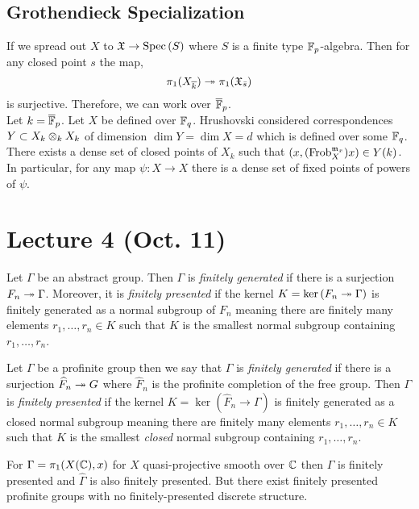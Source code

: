 \documentclass[12pt]{article}
\begin{document}
\subsection{Grothendieck Specialization}

If we spread out $X$ to $\mathfrak{X} \to \mathrm{Spec}\left( S \right)$ where $S$ is a finite type $\mathbb{F}_p$-algebra. Then for any closed point $s$ the map,
\[ \pi_1(X_{\overline{k}}) \twoheadrightarrow \pi_1(\mathfrak{X}_{\bar{s}}) \]
is surjective. Therefore, we can work over $\overline{\mathbb{F}}_p$.
\bigskip\\
Let $k = \overline{\mathbb{F}}_p$. Let $X$ be defined over $\mathbb{F}_q$. Hrushovski considered correspondences $Y \subset X_{k} \otimes_k X_k$ of dimension $\dim{Y} = \dim{X} = d$ which is defined over some $\mathbb{F}_q$. There exists a dense set of closed points of $X_{k}$ such that $(x, (\mathrm{Frob}_X^{\mathfrak{m}_x}) x) \in Y(k)$. 
\bigskip\\
In particular, for any map $\psi : X \to X$ there is a dense set of fixed points of powers of $\psi$. 

\section{Lecture 4 (Oct. 11)}

\begin{defn}
Let $\Gamma$ be an abstract group. Then $\Gamma$ is \textit{finitely generated} if there is a surjection $F_n \twoheadrightarrow \Gamma$. Moreover, it is \textit{finitely presented} if the kernel $K = \ker{(F_n \twoheadrightarrow\Gamma)}$ is finitely generated as a normal subgroup of $F_n$ meaning there are finitely many elements $r_1, \dots, r_n \in K$ such that $K$ is the smallest normal subgroup containing $r_1, \dots, r_n$.  
\end{defn}

\begin{defn}
Let $\Gamma$ be a profinite group then we say that $\Gamma$ is \textit{finitely generated} if there is a surjection $\widehat{F}_n \twoheadrightarrow G$ where $\widehat{F}_n$ is the profinite completion of the free group. Then $\Gamma$ is \textit{finitely presented} if the kernel $K = \ker{(\widehat{F}_n \to \Gamma)}$ is finitely generated as a closed normal subgroup meaning there are finitely many elements $r_1, \dots, r_n \in K$ such that $K$ is the smallest \textit{closed} normal subgroup containing $r_1, \dots, r_n$. 
\end{defn}

\begin{example}
For $\Gamma = \pi_1(X(\mathbb{C}), x)$ for $X$ quasi-projective smooth over $\mathbb{C}$ then $\Gamma$ is finitely presented and $\widehat{\Gamma}$ is also finitely presented. But there exist finitely presented profinite groups with no finitely-presented discrete structure.
\end{example}
\end{document}
